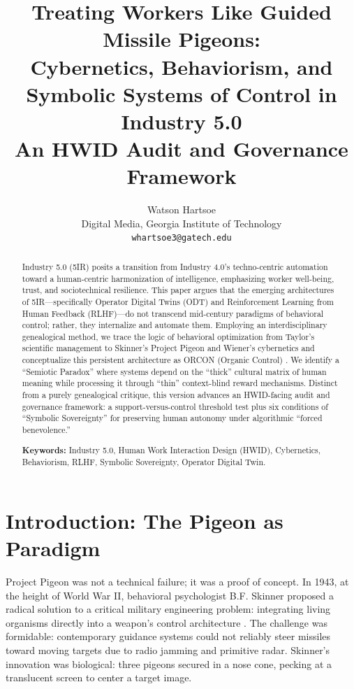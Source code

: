\documentclass[11pt, a4paper]{article}
\title{\textbf{Treating Workers Like Guided Missile Pigeons: \\ Cybernetics, Behaviorism, and Symbolic Systems of Control in Industry 5.0}\\ \large An HWID Audit and Governance Framework}
\author{Watson Hartsoe \\ 
\normalsize Digital Media, Georgia Institute of Technology \\ 
\normalsize \texttt{whartsoe3@gatech.edu}}
\date{}
\begin{document}
\maketitle

\begin{abstract}
Industry 5.0 (5IR) posits a transition from Industry 4.0's techno-centric automation toward a human-centric harmonization of intelligence, emphasizing worker well-being, trust, and sociotechnical resilience. This paper argues that the emerging architectures of 5IR—specifically Operator Digital Twins (ODT) and Reinforcement Learning from Human Feedback (RLHF)—do not transcend mid-century paradigms of behavioral control; rather, they internalize and automate them. Employing an interdisciplinary genealogical method, we trace the logic of behavioral optimization from Taylor’s scientific management to Skinner’s Project Pigeon and Wiener’s cybernetics and conceptualize this persistent architecture as ORCON (Organic Control) \cite{taylor1911principles,skinner1953science,skinner1960pigeons,wiener1948cybernetics}. We identify a ``Semiotic Paradox'' where systems depend on the ``thick'' cultural matrix of human meaning while processing it through ``thin'' context-blind reward mechanisms. Distinct from a purely genealogical critique, this version advances an HWID-facing audit and governance framework: a support-versus-control threshold test plus six conditions of ``Symbolic Sovereignty'' for preserving human autonomy under algorithmic ``forced benevolence.''

\vspace{0.5em}
\noindent \textbf{Keywords:} Industry 5.0, Human Work Interaction Design (HWID), Cybernetics, Behaviorism, RLHF, Symbolic Sovereignty, Operator Digital Twin.
\end{abstract}


\section{Introduction: The Pigeon as Paradigm}

Project Pigeon was not a technical failure; it was a proof of concept. In 1943, at the height of World War II, behavioral psychologist B.F. Skinner proposed a radical solution to a critical military engineering problem: integrating living organisms directly into a weapon's control architecture \cite{skinner1960pigeons}. The challenge was formidable: contemporary guidance systems could not reliably steer missiles toward moving targets due to radio jamming and primitive radar. Skinner's innovation was biological: three pigeons secured in a nose cone, pecking at a translucent screen to center a target image.
\end{document}

